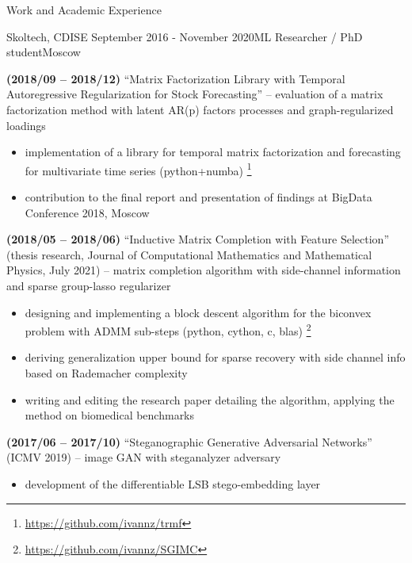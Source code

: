 \documentclass{resume} %
\begin{document}
\begin{rSection}{Work and Academic Experience}
\begin{rSubsection}{
        Skoltech, CDISE
    }{September 2016 - November 2020}{ML Researcher / PhD student}{Moscow}
    \item \textbf{(2018/09 -- 2018/12)}
    ``Matrix Factorization Library with Temporal Autoregressive Regularization for Stock Forecasting'' -- evaluation of a matrix factorization method with latent AR(p) factors processes and graph-regularized loadings
    \begin{itemize}
        \item implementation of a library for temporal matrix factorization and forecasting for multivariate time series (python+numba)%
        \footnote{
            \url{https://github.com/ivannz/trmf}
        }

        \item contribution to the final report and presentation of findings at BigData Conference 2018, Moscow
    \end{itemize}


    \item \textbf{(2018/05 -- 2018/06)}
    ``Inductive Matrix Completion with Feature Selection'' (thesis research, Journal of Computational Mathematics and Mathematical Physics, July 2021) -- matrix completion algorithm with side-channel information and sparse group-lasso regularizer
    \begin{itemize}
        \item designing and implementing a block descent algorithm for the biconvex problem with ADMM sub-steps (python, cython, c, blas)%
        \footnote{
            \url{https://github.com/ivannz/SGIMC}
        }

        \item deriving generalization upper bound for sparse recovery with side channel info based on Rademacher complexity

        \item writing and editing the research paper detailing the algorithm, applying the method on biomedical benchmarks
    \end{itemize}

    \item \textbf{(2017/06 -- 2017/10)}
    ``Steganographic Generative Adversarial Networks'' (ICMV 2019) -- image GAN with steganalyzer adversary
    \begin{itemize}
        \item development of the differentiable LSB stego-embedding layer


\end{itemize}
\end{rSubsection}
\end{rSection}
\end{document}
